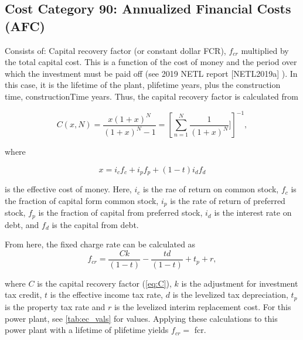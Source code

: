 
\subsection{Cost Category 90: Annualized Financial Costs (AFC)}


Consists of: Capital recovery factor (or constant dollar FCR), $f_{cr}$ multiplied by the total capital cost. This is a function of the cost of money and the period over which the investment must be paid off (see 2019 NETL report
[NETL2019a] %
). In this case, it is the lifetime of the plant, plifetime years, plus the construction time, constructionTime years. Thus, the capital recovery factor is calculated from

\begin{equation}
    C(x,N) = \frac{x(1+x)^N}{(1+x)^N-1} = \left[ \sum_{n=1}^N \frac{1}{(1+x)^N}] \right] ^{-1},
    \label{eq:C}
\end{equation}

where 

\begin{equation}
    x = i_cf_c + i_pf_p +(1-t)i_df_d
\end{equation}

is the effective cost of money. Here, $i_c$ is the rae of return on common stock, $f_c$ is the fraction of capital form common stock, $i_p$ is the rate of return of preferred stock, $f_p$ is the fraction of capital from preferred stock, $i_d$ is the interest rate on debt, and $f_d$ is the capital from debt.

From here, the fixed charge rate can be calculated as 
\begin{equation}
    f_{cr} = \frac{Ck}{(1-t)} - \frac{td}{(1-t)} + t_p + r,
\end{equation}

where $C$ is the capital recovery factor (\ref{eq:C}), $k$ is the adjustment for investment tax credit, $t$ is the effective income tax rate, $d$ is the levelized tax depreciation, $t_p$ is the property tax rate and $r$ is the levelized interim replacement cost. For this power plant, see \ref{tab:ec_vals} for values. Applying these calculations to this power plant with a lifetime of plifetime yields $f_{cr} = $ fcr.\\


